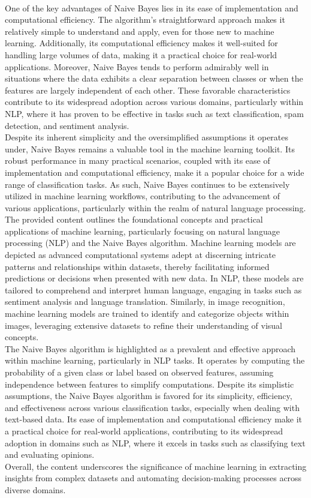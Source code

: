 \\
One of the key advantages of Naive Bayes lies in its ease of implementation and computational efficiency. The algorithm's straightforward approach makes it relatively simple to understand and apply, even for those new to machine learning. Additionally, its computational efficiency makes it well-suited for handling large volumes of data, making it a practical choice for real-world applications. Moreover, Naive Bayes tends to perform admirably well in situations where the data exhibits a clear separation between classes or when the features are largely independent of each other. These favorable characteristics contribute to its widespread adoption across various domains, particularly within NLP, where it has proven to be effective in tasks such as text classification, spam detection, and sentiment analysis.
\\
Despite its inherent simplicity and the oversimplified assumptions it operates under, Naive Bayes remains a valuable tool in the machine learning toolkit. Its robust performance in many practical scenarios, coupled with its ease of implementation and computational efficiency, make it a popular choice for a wide range of classification tasks. As such, Naive Bayes continues to be extensively utilized in machine learning workflows, contributing to the advancement of various applications, particularly within the realm of natural language processing.
\\
The provided content outlines the foundational concepts and practical applications of machine learning, particularly focusing on natural language processing (NLP) and the Naive Bayes algorithm. Machine learning models are depicted as advanced computational systems adept at discerning intricate patterns and relationships within datasets, thereby facilitating informed predictions or decisions when presented with new data. In NLP, these models are tailored to comprehend and interpret human language, engaging in tasks such as sentiment analysis and language translation. Similarly, in image recognition, machine learning models are trained to identify and categorize objects within images, leveraging extensive datasets to refine their understanding of visual concepts.
\\
The Naive Bayes algorithm is highlighted as a prevalent and effective approach within machine learning, particularly in NLP tasks. It operates by computing the probability of a given class or label based on observed features, assuming independence between features to simplify computations. Despite its simplistic assumptions, the Naive Bayes algorithm is favored for its simplicity, efficiency, and effectiveness across various classification tasks, especially when dealing with text-based data. Its ease of implementation and computational efficiency make it a practical choice for real-world applications, contributing to its widespread adoption in domains such as NLP, where it excels in tasks such as classifying text and evaluating opinions.
\\
Overall, the content underscores the significance of machine learning in extracting insights from complex datasets and automating decision-making processes across diverse domains.
